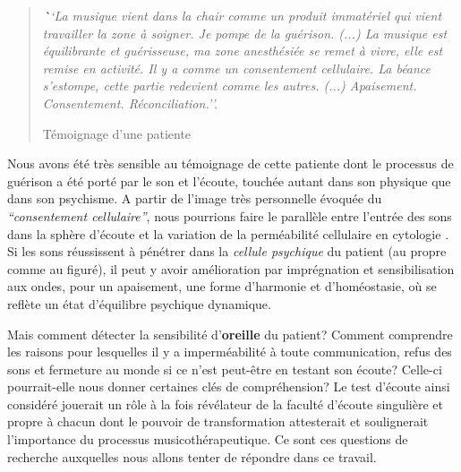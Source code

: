 

\begin{quotation}
 \textit{\textbf ``La musique vient dans la chair comme un produit immatériel
 qui vient travailler la zone à soigner. Je pompe de la
 guérison.
 (...)
 La musique est équilibrante et guérisseuse, ma zone
 anesthésiée se remet à vivre, elle est remise en activité.
 Il y a comme un consentement cellulaire.
La béance s'estompe, cette
partie redevient comme les autres. (...)
Apaisement. Consentement. Réconciliation.''.}

Témoignage d'une patiente

\end{quotation}



Nous avons été très sensible au témoignage de cette patiente dont le
processus de guérison a été porté par le son et l'écoute, touchée
autant dans son physique
que dans son psychisme.
A partir de l'image très personnelle évoquée du
\textit{``consentement cellulaire''}, nous pourrions faire le
parallèle entre l'entrée des sons dans la sphère d'écoute et la variation de la
perméabilité cellulaire en cytologie \autocite[70--76]{marieb:biologie}. Si les sons réussissent à pénétrer dans la
\textit{cellule psychique} du patient (au propre comme au figuré),  il peut y avoir amélioration par imprégnation et sensibilisation aux ondes, pour un apaisement, une forme d'harmonie et d'homéostasie,  \autocite[10]{marieb:biologie} où se reflète un état d'équilibre psychique dynamique.

Mais comment détecter la sensibilité d'\textbf{oreille} du patient?
Comment comprendre les raisons pour lesquelles il y a imperméabilité à toute communication, refus des sons et fermeture au monde si ce n'est
peut-être en testant
son écoute?  Celle-ci pourrait-elle nous donner certaines clés de compréhension?
Le test d'écoute ainsi considéré jouerait un rôle à la fois révélateur de la faculté d'écoute singulière et 
propre à chacun dont le  pouvoir de transformation attesterait  et soulignerait l'importance du processus 
musicothérapeutique.
Ce sont ces questions de recherche auxquelles nous allons tenter de répondre dans ce travail.


